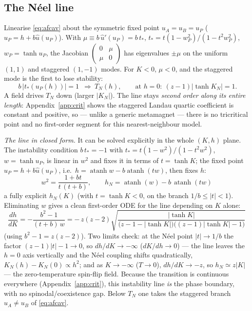 \documentclass[11pt]{article}
\newcommand{\atanh}{\operatorname{atanh}}
\begin{document}
\subsection{The N\'eel line}
Linearise \eqref{eq:afcav} about the symmetric fixed point $u_A=u_B=u_P$ ($u_P=h+b\hat u(u_P)$). With
$\mu\equiv b\,\hat u'(u_P)=b\,t_*$, $t_*=t(1-w_P^2)/(1-t^2w_P^2)$, $w_P=\tanh u_P$, the Jacobian
$\left(\begin{smallmatrix}0&\mu\\\mu&0\end{smallmatrix}\right)$ has eigenvalues $\pm\mu$ on the uniform
$(1,1)$ and staggered $(1,-1)$ modes. For $K<0$, $\mu<0$, and the staggered mode is the first to lose
stability:
\begin{equation}
\boxed{\;b\,|t_*(u_P(h))|=1\;}\ \Longrightarrow\ T_N(h),\qquad
\text{at }h=0:\ (z-1)|\tanh K_N|=1 .
\end{equation}
A field drives $T_N$ down (larger $|K_N|$). The line stays \emph{second order along its entire length}:
Appendix~\ref{app:crit} shows the staggered Landau quartic coefficient is constant and positive, so ---
unlike a generic metamagnet --- there is no tricritical point and no first-order segment for this
nearest-neighbour model.

\emph{The line in closed form.} It can be solved explicitly in the whole $(K,h)$ plane. The instability
condition $b\,t_*=-1$ with $t_*=t(1-w^2)/(1-t^2w^2)$, $w=\tanh u_P$, is linear in $w^2$ and fixes it in
terms of $t=\tanh K$; the fixed point $u_P=h+b\hat u(u_P)$, i.e.\ $h=\atanh w-b\atanh(tw)$, then fixes
$h$:
\begin{equation}
\boxed{\;w^2=\frac{1+bt}{t\,(t+b)},\qquad h_N=\atanh(w)-b\,\atanh(tw)\;}
\end{equation}
a fully explicit $h_N(K)$ (with $t=\tanh K<0$, on the branch $1/b\le|t|<1$). Eliminating $w$ gives a
clean first-order ODE for the line depending on $K$ alone:
\begin{equation}
\boxed{\;\frac{dh}{dK}=-\frac{b^2-1}{(t+b)\,w}=-\,z(z-2)\sqrt{\frac{|\tanh K|}
{\big(z{-}1{-}|\tanh K|\big)\big((z{-}1)|\tanh K|-1\big)}}\;}
\end{equation}
(using $b^2-1=z(z-2)$). Two limits check: at the N\'eel point $|t|\to1/b$ the factor
$(z{-}1)|t|-1\to0$, so $dh/dK\to-\infty$ ($dK/dh\to0$) --- the line leaves the $h=0$ axis vertically and
the N\'eel coupling shifts quadratically, $K_N(h)-K_N(0)\propto h^2$; and as $K\to-\infty$ ($T\to0$),
$dh/dK\to-z$, so $h_N\simeq z|K|$ --- the zero-temperature spin-flip field. Because the transition is
continuous everywhere (Appendix~\ref{app:crit}), this instability line \emph{is} the phase boundary,
with no spinodal/coexistence gap. Below $T_N$ one takes the staggered branch $u_A\neq u_B$ of
\eqref{eq:afcav}.
\end{document}
